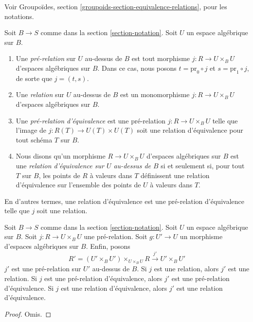 \noindent
Voir Groupoïdes, section \ref{groupoids-section-equivalence-relations}, pour les notations.

\begin{definition}
\label{definition-equivalence-relation}
Soit $B \to S$ comme dans la section \ref{section-notation}. Soit $U$ un espace algébrique sur $B$.
\begin{enumerate}
\item Une {\it pré-relation} sur $U$ au-dessus de $B$ est tout morphisme $j : R \to U \times_B U$ d'espaces algébriques sur $B$. Dans ce cas, nous posons $t = \text{pr}_0 \circ j$ et $s = \text{pr}_1 \circ j$, de sorte que $j = (t, s)$.
\item Une {\it relation} sur $U$ au-dessus de $B$ est un monomorphisme $j : R \to U \times_B U$ d'espaces algébriques sur $B$.
\item Une {\it pré-relation d'équivalence} est une pré-relation $j : R \to U \times_B U$ telle que l'image de $j : R(T) \to U(T) \times U(T)$ soit une relation d'équivalence pour tout schéma $T$ sur $B$.
\item Nous disons qu'un morphisme $R \to U \times_B U$ d'espaces algébriques sur $B$ est une {\it relation d'équivalence sur $U$ au-dessus de $B$} si et seulement si, pour tout $T$ sur $B$, les points de $R$ à valeurs dans $T$ définissent une relation d'équivalence sur l'ensemble des points de $U$ à valeurs dans $T$.
\end{enumerate}
\end{definition}

\noindent
En d'autres termes, une relation d'équivalence est une pré-relation d'équivalence telle que $j$ soit une relation.

\begin{lemma}
\label{lemma-restrict-relation}
Soit $B \to S$ comme dans la section \ref{section-notation}. Soit $U$ un espace algébrique sur $B$. Soit $j : R \to U \times_B U$ une pré-relation. Soit $g : U' \to U$ un morphisme d'espaces algébriques sur $B$. Enfin, posons
$$
R' = (U' \times_B U')\times_{U \times_B U} R
\xrightarrow{j'}
U' \times_B U'
$$
$j'$ est une pré-relation sur $U'$ au-dessus de $B$. Si $j$ est une relation, alors $j'$ est une relation. Si $j$ est une pré-relation d'équivalence, alors $j'$ est une pré-relation d'équivalence. Si $j$ est une relation d'équivalence, alors $j'$ est une relation d'équivalence.
\end{lemma}

\begin{proof}
Omis.
\end{proof}

